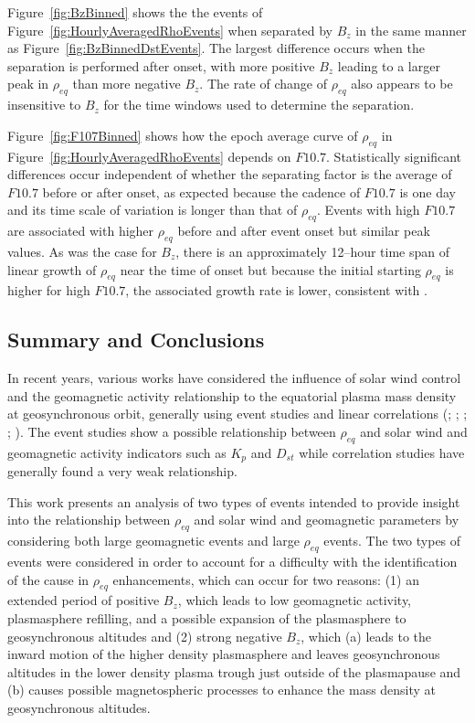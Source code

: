 \documentclass[12pt]{article}
\begin{document}
Figure~\ref{fig:BzBinned} shows the the events of Figure~\ref{fig:HourlyAveragedRhoEvents} when separated by $B_z$ in the same manner as Figure~\ref{fig:BzBinnedDstEvents}.  The largest difference occurs when the separation is performed after onset, with more positive $B_z$ leading to a larger peak in $\rho_{eq}$ than more negative $B_{z}$.  The rate of change of $\rho_{eq}$ also appears to be insensitive to $B_z$ for the time windows used to determine the separation.  


Figure~\ref{fig:F107Binned} shows how the epoch average curve of $\rho_{eq}$ in Figure~\ref{fig:HourlyAveragedRhoEvents} depends on $F10.7$.  Statistically significant differences occur independent of whether the separating factor is the average of $F10.7$ before or after onset, as expected because the cadence of $F10.7$ is one day and its time scale of variation is longer than that of $\rho_{eq}$.  Events with high $F10.7$ are associated with higher $\rho_{eq}$ before and after event onset but similar peak values.  As was the case for $B_z$, there is an approximately 12--hour time span of linear growth of $\rho_{eq}$ near the time of onset but because the initial starting $\rho_{eq}$ is higher for high $F10.7$, the associated growth rate is lower, consistent with \cite{Denton2016}.

\subsection{Summary and Conclusions}

In recent years, various works have considered the influence of solar wind control and the geomagnetic activity relationship to the equatorial plasma mass density at geosynchronous orbit, generally using event studies and linear correlations (\cite{Takahashi2006}; \cite{Denton2006}; \cite{Yao2008}; \cite{Takahashi2010}; \cite{Denton2016}).  The event studies show a possible relationship between $\rho_{eq}$ and solar wind and geomagnetic activity indicators such as $K_p$ and $D_{st}$ while correlation studies have generally found a very weak relationship.

This work presents an analysis of two types of events intended to provide insight into the relationship between $\rho_{eq}$ and solar wind and geomagnetic parameters by considering both large geomagnetic events and large $\rho_{eq}$ events.  The two types of events were considered in order to account for a difficulty with the identification of the cause in $\rho_{eq}$ enhancements, which can occur for two reasons: (1) an extended period of positive $B_z$, which leads to low geomagnetic activity, plasmasphere refilling, and a possible expansion of the plasmasphere to geosynchronous altitudes and (2) strong negative $B_z$, which (a) leads to the inward motion of the higher density plasmasphere and leaves geosynchronous altitudes in the lower density plasma trough just outside of the plasmapause and (b) causes possible magnetospheric processes to enhance the mass density at geosynchronous altitudes.
\end{document}
